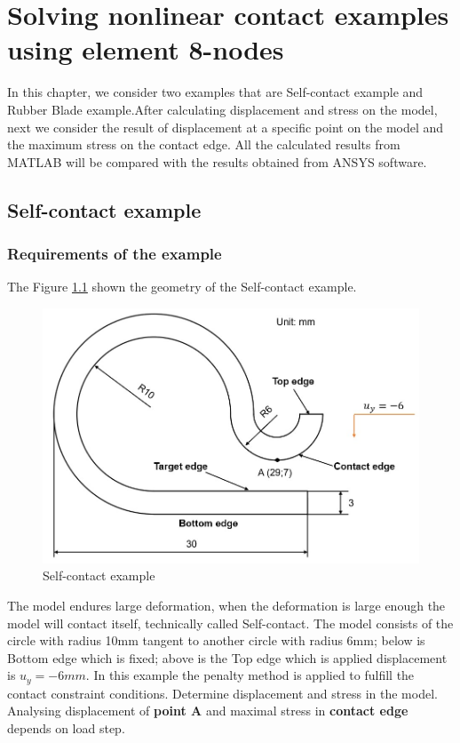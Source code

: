 \chapter{Solving nonlinear contact examples using element 8-nodes} %

\label{Chapter4 } %

In this chapter, we consider two examples that are Self-contact example and Rubber Blade
example.After calculating displacement and stress on the model, next we consider the result of
displacement at a specific point on the model and the maximum stress on the contact edge. All the
calculated results from MATLAB will be compared with the results obtained from ANSYS software.
\newpage
\section{Self-contact example}

\subsection{Requirements of the example}

The Figure \ref{fig:contactself_exam} shown the geometry of the Self-contact example.

\begin{figure}[H]
    \centering
    \includegraphics[scale=0.6]{Figures/contactself.jpg}
    \decoRule   
    \caption{Self-contact example}
    \label{fig:contactself_exam}
\end{figure} \noindent
\noindent
The model endures large deformation, when the deformation is large enough the
model will contact itself, technically called Self-contact. The model consists of the circle with
radius 10mm tangent to another circle with radius 6mm; below is Bottom edge which is fixed; above
is the Top edge which is applied displacement is $u_y = - 6 mm$. 
In this example the penalty method is applied to fulfill the contact constraint conditions.
Determine displacement and stress in the model.
Analysing displacement of {\bf point A} and maximal stress in {\bf contact edge} depends on
load step. \\

